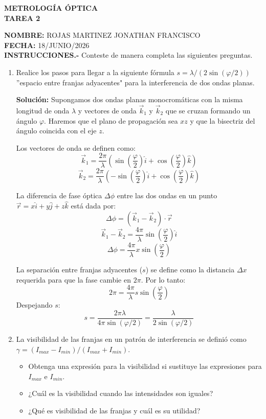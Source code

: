 \documentclass[12pt, letterpaper]{article}
\begin{document}
	
	\begin{center}
		\Large \textbf{METROLOGÍA ÓPTICA} \\
		\large \textbf{TAREA 2} 
	\end{center}
	
	\vspace{0.5cm}
	\noindent \textbf{NOMBRE:} ROJAS MARTINEZ JONATHAN FRANCISCO\\
	\noindent \textbf{FECHA:} 18/JUNIO/2026\\[1em]
	
	\noindent \textbf{INSTRUCCIONES.-} Conteste de manera completa las siguientes preguntas.
	
	\begin{enumerate}
		\item Realice los pasos para llegar a la siguiente fórmula $s=\lambda/(2\sin(\varphi/2))$ ''espacio entre franjas adyacentes" para la interferencia de dos ondas planas.
		
		\textbf{Solución:}
		Supongamos dos ondas planas monocromáticas con la misma longitud de onda $\lambda$ y vectores de onda $\vec{k}_1$ y $\vec{k}_2$ que se cruzan formando un ángulo $\varphi$. Haremos que el plano de propagación sea $xz$ y que la bisectriz del ángulo coincida con el eje $z$.
		
		Los vectores de onda se definen como:
		$$ \vec{k}_1 = \frac{2\pi}{\lambda} \left( \sin\left(\frac{\varphi}{2}\right)\hat{i} + \cos\left(\frac{\varphi}{2}\right)\hat{k} \right) $$
		$$ \vec{k}_2 = \frac{2\pi}{\lambda} \left( -\sin\left(\frac{\varphi}{2}\right)\hat{i} + \cos\left(\frac{\varphi}{2}\right)\hat{k} \right) $$
		
		La diferencia de fase óptica $\Delta\phi$ entre las dos ondas en un punto $\vec{r} = x\hat{i} + y\hat{j} + z\hat{k}$ está dada por:
		$$ \Delta\phi = (\vec{k}_1 - \vec{k}_2) \cdot \vec{r} $$
		$$ \vec{k}_1 - \vec{k}_2 = \frac{4\pi}{\lambda} \sin\left(\frac{\varphi}{2}\right)\hat{i} $$
		$$ \Delta\phi = \frac{4\pi}{\lambda} x \sin\left(\frac{\varphi}{2}\right) $$
		
		La separación entre franjas adyacentes ($s$) se define como la distancia $\Delta x$ requerida para que la fase cambie en $2\pi$. Por lo tanto:
		$$ 2\pi = \frac{4\pi}{\lambda} s \sin\left(\frac{\varphi}{2}\right) $$
		Despejando $s$:
		$$ s = \frac{2\pi \lambda}{4\pi \sin(\varphi/2)} = \frac{\lambda}{2\sin(\varphi/2)} $$
		
		\item La visibilidad de las franjas en un patrón de interferencia se definió como $\gamma=(I_{max}-I_{min})/(I_{max}+I_{min})$. 
		\begin{itemize}
			\item Obtenga una expresión para la visibilidad si sustituye las expresiones para $I_{max}$ e $I_{min}$.
			\item ¿Cuál es la visibilidad cuando las intensidades son iguales?
			\item ¿Qué es visibilidad de las franjas y cuál es su utilidad?  
		\end{itemize}
		

\end{enumerate}
\end{document}
